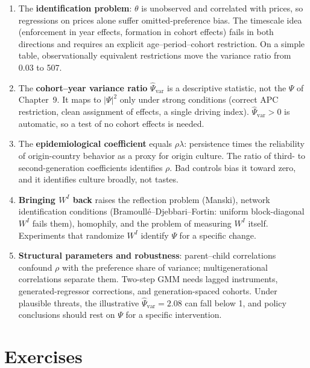 \documentclass[../structural_economics_book.tex]{subfiles}
\begin{document}
\begin{enumerate}
\item The \textbf{identification problem}: $\theta$ is unobserved and correlated with prices, so regressions on prices alone suffer omitted-preference bias. The timescale idea (enforcement in year effects, formation in cohort effects) fails in both directions and requires an explicit age--period--cohort restriction. On a simple table, observationally equivalent restrictions move the variance ratio from 0.03 to 507.

\item The \textbf{cohort--year variance ratio} $\hat{\Psi}_{\text{var}}$ is a descriptive statistic, not the $\Psi$ of Chapter~9. It maps to $|\Psi|^2$ only under strong conditions (correct APC restriction, clean assignment of effects, a single driving index). $\hat{\Psi}_{\text{var}} > 0$ is automatic, so a test of no cohort effects is needed.

\item The \textbf{epidemiological coefficient} equals $\rho\lambda$: persistence times the reliability of origin-country behavior as a proxy for origin culture. The ratio of third- to second-generation coefficients identifies $\rho$. Bad controls bias it toward zero, and it identifies culture broadly, not tastes.

\item \textbf{Bringing $W^I$ back} raises the reflection problem (Manski), network identification conditions (Bramoull\'{e}--Djebbari--Fortin: uniform block-diagonal $W^I$ fails them), homophily, and the problem of measuring $W^I$ itself. Experiments that randomize $W^I$ identify $\Psi$ for a specific change.

\item \textbf{Structural parameters and robustness}: parent--child correlations confound $\rho$ with the preference share of variance; multigenerational correlations separate them. Two-step GMM needs lagged instruments, generated-regressor corrections, and generation-spaced cohorts. Under plausible threats, the illustrative $\hat{\Psi}_{\text{var}} = 2.08$ can fall below 1, and policy conclusions should rest on $\Psi$ for a specific intervention.
\end{enumerate}


\section{Exercises}
\label{ch11:sec:exercises}
\end{document}
